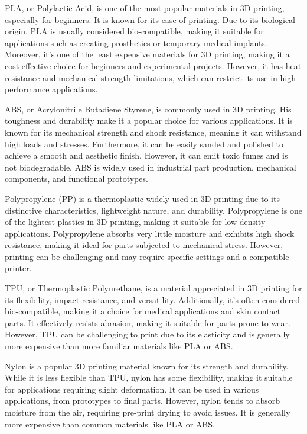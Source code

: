 PLA, or Polylactic Acid, is one of the most popular materials in 3D printing, especially for beginners. It is known for its ease of printing. Due to its biological origin, PLA is usually considered bio-compatible, making it suitable for applications such as creating prosthetics or temporary medical implants. Moreover, it’s one of the least expensive materials for 3D printing, making it a cost-effective choice for beginners and experimental projects. However, it has heat resistance and mechanical strength limitations, which can restrict its use in high-performance applications.

ABS, or Acrylonitrile Butadiene Styrene, is commonly used in 3D printing. His toughness and durability make it a popular choice for various applications. It is known for its mechanical strength and shock resistance, meaning it can withstand high loads and stresses. Furthermore, it can be easily sanded and polished to achieve a smooth and aesthetic finish. However, it can emit toxic fumes and is not biodegradable. ABS is widely used in industrial part production, mechanical components, and functional prototypes. 

Polypropylene (PP) is a thermoplastic widely used in 3D printing due to its distinctive characteristics, lightweight nature, and durability. Polypropylene is one of the lightest plastics in 3D printing, making it suitable for low-density applications. Polypropylene absorbs very little moisture and exhibits high shock resistance, making it ideal for parts subjected to mechanical stress. However, printing can be challenging and may require specific settings and a compatible printer.

TPU, or Thermoplastic Polyurethane, is a material appreciated in 3D printing for its flexibility, impact resistance, and versatility. Additionally, it’s often considered bio-compatible, making it a choice for medical applications and skin contact parts. It effectively resists abrasion, making it suitable for parts prone to wear. However, TPU can be challenging to print due to its elasticity and is generally more expensive than more familiar materials like PLA or ABS.

Nylon is a popular 3D printing material known for its strength and durability. While it is less flexible than TPU, nylon has some flexibility, making it suitable for applications requiring slight deformation. It can be used in various applications, from prototypes to final parts. However, nylon tends to absorb moisture from the air, requiring pre-print drying to avoid issues. It is generally more expensive than common materials like PLA or ABS.

